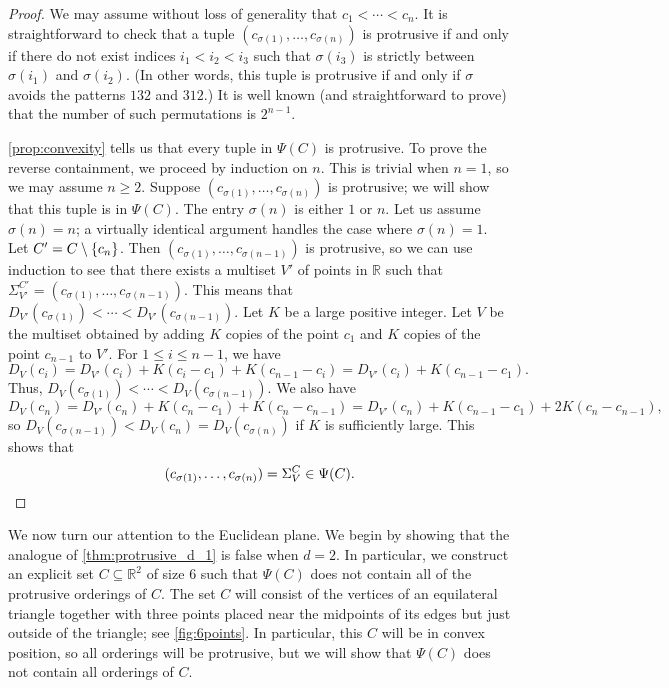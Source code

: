 \documentclass[11pt]{amsart}
\theoremstyle{definition}
\DeclarePairedDelimiter{\set}{\{}{\}}
\newcommand{\RR}{\mathbb{R}}
\begin{document}
\begin{proof}
We may assume without loss of generality that $c_1<\cdots<c_n$. It is straightforward to check that a tuple $(c_{\sigma(1)},\ldots,c_{\sigma(n)})$ is protrusive if and only if there do not exist indices $i_1<i_2<i_3$ such that $\sigma(i_3)$ is strictly between $\sigma(i_1)$ and $\sigma(i_2)$. (In other words, this tuple is protrusive if and only if $\sigma$ avoids the patterns $132$ and $312$.) It is well known (and straightforward to prove) that the number of such permutations is $2^{n-1}$.

\cref{prop:convexity} tells us that every tuple in $\Psi(C)$ is protrusive. To prove the reverse containment, we proceed by induction on $n$. This is trivial when $n=1$, so we may assume $n\geq 2$. Suppose $(c_{\sigma(1)},\ldots,c_{\sigma(n)})$ is protrusive; we will show that this tuple is in $\Psi(C)$. The entry $\sigma(n)$ is either $1$ or $n$. Let us assume $\sigma(n)=n$; a virtually identical argument handles the case where $\sigma(n)=1$. Let $C'=C\setminus\set{c_n}$. Then $(c_{\sigma(1)},\ldots,c_{\sigma(n-1)})$ is protrusive, so we can use induction to see that there exists a multiset $V'$ of points in $\RR$ such that $\Sigma_{V'}^{C'}=(c_{\sigma(1)},\ldots,c_{\sigma(n-1)})$. This means that $D_{V'}(c_{\sigma(1)})<\cdots<D_{V'}(c_{\sigma(n-1)})$. Let $K$ be a large positive integer. Let $V$ be the multiset obtained by adding $K$ copies of the point $c_1$ and $K$ copies of the point $c_{n-1}$ to $V'$. For $1\leq i\leq n-1$, we have \[D_V(c_i)=D_{V'}(c_i)+K(c_i-c_1)+K(c_{n-1}-c_i)=D_{V'}(c_i)+K(c_{n-1}-c_1).\] Thus, $D_V(c_{\sigma(1)})<\cdots<D_V(c_{\sigma(n-1)})$. We also have \[D_V(c_n)=D_{V'}(c_n)+K(c_n-c_1)+K(c_n-c_{n-1})=D_{V'}(c_n)+K(c_{n-1}-c_1)+2K(c_n-c_{n-1}),\] so $D_V(c_{\sigma(n-1)})<D_V(c_n)=D_V(c_{\sigma(n)})$ if $K$ is sufficiently large. This shows that \[(c_{\sigma(1)},\ldots,c_{\sigma(n)})=\Sigma_V^C\in\Psi(C).\qedhere\] 
\end{proof}

We now turn our attention to the Euclidean plane. We begin by showing that the analogue of \cref{thm:protrusive_d_1} is false when $d=2$.  In particular, we construct an explicit set $C \subseteq \RR^2$ of size $6$ such that $\Psi(C)$ does not contain all of the protrusive orderings of $C$.  The set $C$ will consist of the vertices of an equilateral triangle together with three points placed near the midpoints of its edges but just outside of the triangle; see \cref{fig:6points}.  In particular, this $C$ will be in convex position, so all orderings will be protrusive, but we will show that $\Psi(C)$ does not contain all orderings of $C$.
\end{document}
